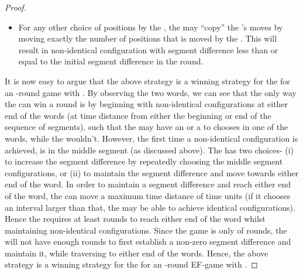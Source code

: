 \documentclass{llncs}
\newcommand{\ssp}{\mbox{}}
\newcommand{\ddp}{\mbox{}}
\newcommand{\mitlfpzinf}{\mbox{}}
\begin{document}
\begin{proof}
\begin{itemize}
\begin{itemize}
\item For any other choice of positions by the \ssp\/, the \ddp\/ may ``copy'' the \ssp\/'s moves by moving exactly the number of positions that is moved by the \ssp. This will result in non-identical configuration with segment difference less than or equal to the initial segment difference in the round.
\end{itemize}
\end{itemize}
It is now easy to argue that the above strategy is a winning strategy for the \ddp\/ for an -round \mitlfpzinf\/ game with . By observing the two words, we can see that the only way the \ssp\/ can win a round is by beginning with non-identical configurations at either end of the words (at time distance  from either the beginning or end of the sequence of segments), such that the \ssp\/ may have an  or a  to chooses in one of the words, while the \ddp\/ wouldn't. However, the first time a non-identical configuration is achieved, is in the middle segment (as discussed above). The \ssp\/ has two choices- (i) to increase the segment difference by repeatedly choosing the middle segment configurations, or (ii) to maintain the segment difference and move towards either end of the word. In order to maintain a segment difference  and reach either end of the word, the \ssp\/ can move a maximum time distance of  time units (if it chooses an interval larger than that, the \ddp\/ may be able to achieve identical configurations). Hence the \ssp\/ requires at least  rounds to reach either end of the word whilst maintaining non-identical configurations. Since the game is only of  rounds, the \ssp\/ will not have enough rounds to first establish a non-zero segment difference and maintain it, while traversing to either end of the words. Hence, the above strategy is a winning strategy for the \ddp\/ for an -round \mitlfpzinf\/ EF-game with .
\end{proof}
\end{document}
